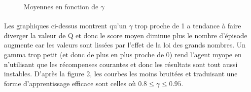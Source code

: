 \documentclass[12pt,oneside,a4paper]{article}
\begin{document}
\begin{figure}[hbt!]
{        }
        \hspace{0mm}
        \caption{Moyennes en fonction de $\gamma$}
    \end{figure}

    \paragraph{}
    Les graphiques ci-dessus montrent qu'un $\gamma$ trop proche de 1 a tendance à faire diverger la
    valeur de $\mathrm{Q}$ et donc le score moyen diminue plus le nombre d'épisode augmente car les valeurs sont lissées
    par l'effet de la loi des grands nombres. Un gamma trop petit (et donc de plus en plus proche de 0)
    rend l'agent myope en n'utilisant que les récompenses courantes et donc les résultats sont tout aussi instables. D'après la figure 2,
    les courbes les moins bruitées et traduisant une forme d'apprentissage efficace sont celles où
    $0.8 \leq \gamma \leq 0.95$.
    \newpage
\end{document}
